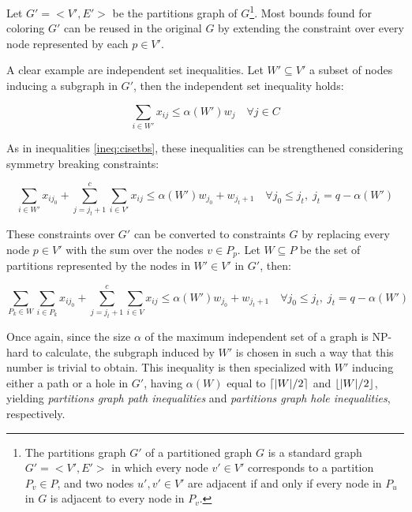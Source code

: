 Let $G' = <V',E'>$ be the partitions graph of $G$\footnote{The partitions graph $G'$ of a partitioned graph $G$ is a standard graph $G'=<V',E'>$ in which every node $v' \in V'$ corresponds to a partition $P_v \in P$, and two nodes $u',v' \in V'$ are adjacent if and only if every node in $P_u$ in $G$ is adjacent to every node in $P_v$.}. Most bounds found for coloring $G'$ can be reused in the original $G$ by extending the constraint over every node represented by each $p \in V'$.

A clear example are independent set inequalities. Let $W' \subseteq V'$ a subset of nodes inducing a subgraph in $G'$, then the independent set inequality holds:

\begin{equation}
\label{ineq:gpiset}
\sum _{i \in W'} x_{ij} \leq \alpha(W') w_{j} \quad \forall j \in C
\end{equation}

As in inequalities \ref{ineq:cisetbs}, these inequalities can be strengthened considering symmetry breaking constraints:

\begin{equation}
\label{ineq:gpisetbs}
\sum_{i \in W'} x_{ij_0} + \sum ^c _{j = j_t + 1} \sum _{i \in V'} x_{ij} \leq \alpha(W') w_{j_0} + w_{j_t + 1} \quad \forall j_0 \leq j_t, \; j_t = q - \alpha(W')
\end{equation}

These constraints over $G'$ can be converted to constraints $G$ by replacing every node $p \in V'$ with the sum over the nodes $v \in P_p$. Let $W \subseteq P$ be the set of partitions represented by the nodes in $W' \in V'$ in $G'$, then:

\begin{equation}
\label{ineq:gpisetbsg}
\sum_{P_k \in W} \sum_{i \in P_k} x_{ij_0} + \sum ^c _{j = j_t + 1} \sum _{i \in V} x_{ij} \leq \alpha(W') w_{j_0} + w_{j_t + 1} \quad \forall j_0 \leq j_t, \; j_t = q - \alpha(W')
\end{equation}

Once again, since the size $\alpha$ of the maximum independent set of a graph is NP-hard to calculate, the subgraph induced by $W'$ is chosen in such a way that this number is trivial to obtain. This inequality is then specialized with $W'$ inducing either a path or a hole in $G'$, having $\alpha(W)$ equal to $\left\lceil |W| / 2 \right\rceil$ and $\left\lfloor |W| / 2 \right\rfloor$, yielding \textit{partitions graph path inequalities} and \textit{partitions graph hole inequalities}, respectively.

